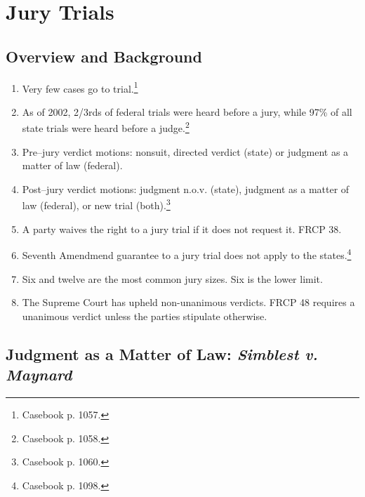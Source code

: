 \section{Jury Trials}

\subsection{Overview and Background}

\begin{enumerate}
    \item Very few cases go to trial.\footnote{Casebook p. 1057.}
    \item As of 2002, 2/3rds of federal trials were heard before a jury, while 
    97\% of all state trials were heard before a judge.\footnote{Casebook p. 
    1058.}
    \item Pre--jury verdict motions: nonsuit, directed verdict (state) or 
    judgment as a matter of law (federal).
    \item Post--jury verdict motions: judgment n.o.v. (state), judgment as a 
    matter of law (federal), or new trial (both).\footnote{Casebook p. 1060.}
    \item A party waives the right to a jury trial if it does not request it. 
    FRCP 38.
    \item Seventh Amendmend guarantee to a jury trial does not apply to the 
    states.\footnote{Casebook p. 1098.}
    \item Six and twelve are the most common jury sizes. Six is the lower 
    limit.
    \item The Supreme Court has upheld non-unanimous verdicts. FRCP 48 
    requires a unanimous verdict unless the parties stipulate otherwise.
\end{enumerate}

\subsection{Judgment as a Matter of Law: \emph{Simblest v. Maynard}}

